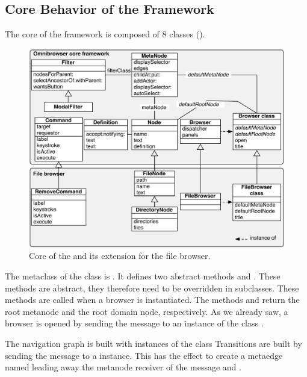\documentclass[a4paper,10pt,twoside]{book}
\begin{document}
\subsection{Core Behavior of the Framework}

The core of the \ob framework is composed of 8 classes ().

\begin{figure}[!ht]
\begin{center}
\includegraphics[width=\textwidth]{Core}
\caption{Core of the \obf and its extension for the file browser.} 
\end{center}
\end{figure}

The metaclass of the class  is . It defines two abstract methods  and . These methods are abstract, they therefore need to be overridden in subclasses. These methods are called when a browser is instantiated. The methods   and  return the root metanode and the root domain node, respectively. As we already saw, a browser is opened by sending the message  to an instance of the class .

The navigation graph is built with instances of the class  Transitions are built by sending the message  to a  instance. This has the effect to create a metaedge named  leading away the metanode receiver of the message and .
\end{document}
